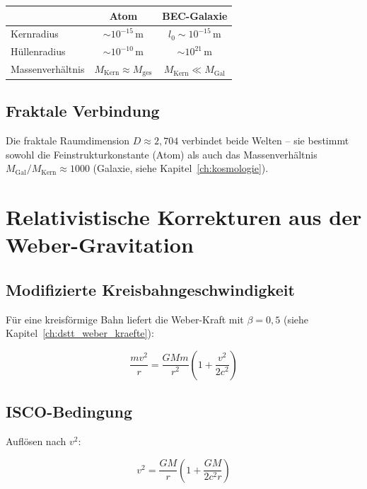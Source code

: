 \begin{center}
\begin{tabular}{lcc}
\hline
 & \textbf{Atom} & \textbf{BEC-Galaxie} \\
\hline
Kernradius & \( \sim 10^{-15} \, \text{m} \) & \( l_0 \sim 10^{-15} \, \text{m} \) \\
Hüllenradius & \( \sim 10^{-10} \, \text{m} \) & \( \sim 10^{21} \, \text{m} \) \\
Massenverhältnis & \( M_{\text{Kern}} \approx M_{\text{ges}} \) & \( M_{\text{Kern}} \ll M_{\text{Gal}} \) \\
\hline
\end{tabular}
\end{center}

\subsection{Fraktale Verbindung}
\label{sub:bec_fraktale_verbindung}

Die fraktale Raumdimension \( D \approx 2,704 \) verbindet beide Welten – 
sie bestimmt sowohl die Feinstrukturkonstante (Atom) als auch das 
Massenverhältnis \( M_{\text{Gal}} / M_{\text{Kern}} \approx 1000 \) 
(Galaxie, siehe Kapitel~\ref{ch:kosmologie}).

\section{Relativistische Korrekturen aus der Weber-Gravitation}
\label{app:bec_relativistik}

\subsection{Modifizierte Kreisbahngeschwindigkeit}
\label{sub:bec_kreisbahn}

Für eine kreisförmige Bahn liefert die Weber-Kraft mit \( \beta = 0,5 \) 
(siehe Kapitel~\ref{ch:dstt_weber_kraefte}):

\[
\frac{mv^2}{r} = \frac{GMm}{r^2} \left( 1 + \frac{v^2}{2c^2} \right) \tag{K.19}
\]

\subsection{ISCO-Bedingung}
\label{sub:bec_isco}

Auflösen nach \( v^2 \):

\[
v^2 = \frac{GM}{r} \left( 1 + \frac{GM}{2c^2 r} \right) \tag{K.20}
\]

